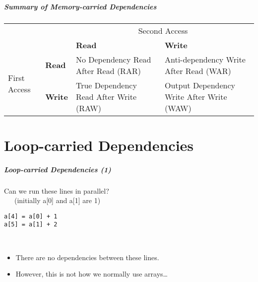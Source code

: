 \documentclass[aspectratio=43]{beamer}
\newenvironment{changemargin}[1]{%
  \begin{list}{}{%
    \setlength{\topsep}{0pt}%
    \setlength{\leftmargin}{#1}%
    \setlength{\rightmargin}{1em}
    \setlength{\listparindent}{\parindent}%
    \setlength{\itemindent}{\parindent}%
    \setlength{\parsep}{\parskip}%
  }%
  \item[]}{\end{list}}
\begin{document}
\begin{frame}
\frametitle{Summary of Memory-carried Dependencies}
\begin{center}
\begin{tabular}{ll|p{2.8cm}p{3.2cm}}
& & \multicolumn{2}{c}{Second Access} \\ 
&  & \bf Read & \bf Write \\ \hline
\multirow{2}{*}{First Access} & \bf Read & No Dependency Read After Read (RAR)  & Anti-dependency Write After Read (WAR) \\[0.5em]
& \bf Write & True Dependency Read After Write (RAW) & Output Dependency Write After Write (WAW) \\
\end{tabular}
\end{center}
\end{frame}


\part{Loop-carried Dependencies}
\frame{\partpage}

\begin{frame}[fragile]
\frametitle{Loop-carried Dependencies (1)}
\begin{changemargin}{2.5cm}
Can we run these lines in parallel? \\ ~~~(initially a[0] and a[1] are 1)
\begin{lstlisting}
a[4] = a[0] + 1
a[5] = a[1] + 2
\end{lstlisting}
\pause
{}\\[1em]
\begin{itemize}
\item There are no dependencies between these lines.
\item However, this is not how we normally use arrays\ldots
\end{itemize}
\end{changemargin}
\end{frame}
\end{document}
